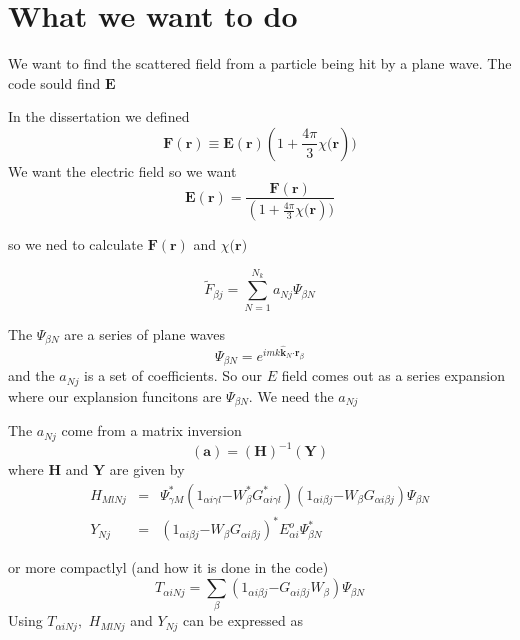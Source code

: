 \documentclass{article}
\begin{document}
\bigskip

\section{What we want to do}

We want to find the scattered field from a particle being hit by a plane
wave. The code sould find $\mathbf{E}$

In the dissertation we defined 
\begin{equation}
\mathbf{F}(\mathbf{r})\equiv \mathbf{E}(\mathbf{r})(1+\frac{4\pi }{3}\chi 
\mathbf{(r}))  \tag{38}  \label{EtoF}
\end{equation}%
We want the electric field so we want%
\[
\mathbf{E}(\mathbf{r})=\frac{\mathbf{F}(\mathbf{r})}{(1+\frac{4\pi }{3}\chi 
\mathbf{(r}))} 
\]

so we ned to calculate $\mathbf{F}(\mathbf{r})$ and $\chi \mathbf{(r})$

\begin{equation}
\tilde{F}_{\beta j}\mathbf{=}\sum_{N=1}^{N_{k}}a_{Nj}\Psi _{\beta N}
\label{CPSI}
\end{equation}

The $\Psi _{\beta N}$ are a series of plane waves%
\begin{equation}
\Psi _{\beta N}=e^{imk\mathbf{\hat{k}}_{N}\mathbf{\cdot r}_{\beta }}
\end{equation}%
and the $a_{Nj}$ is a set of coefficients. So our $E$ field comes out as a
series expansion where our explansion funcitons are $\Psi _{\beta N}$. We
need the $a_{Nj}$

The $a_{Nj}$ come from a matrix inversion 
\begin{equation}
\left( \mathbf{a}\right) =\left( \mathbf{H}\right) ^{-1}\left( \mathbf{Y}%
\right)  \label{aHY}
\end{equation}%
where $\mathbf{H}$ and $\mathbf{Y}$ are given by 
\begin{eqnarray}
H_{MlNj} &=&\Psi _{\gamma M}^{\ast }\left( 1_{\alpha i\gamma l}\mathbf{-}%
W_{\beta }^{\ast }G_{\alpha i\gamma l}^{\ast }\right) \left( 1_{\alpha
i\beta j}\mathbf{-}W_{\beta }G_{\alpha i\beta j}\right) \Psi _{\beta N} 
\nonumber \\
Y_{Nj} &=&\left( 1_{\alpha i\beta j}\mathbf{-}W_{\beta }G_{\alpha i\beta
j}\right) ^{\ast }E_{\alpha i}^{o}\Psi _{\beta N}^{\ast }
\end{eqnarray}

or more compactlyl (and how it is done in the code) 
\begin{equation}
T_{\alpha iNj}=\sum_{\beta }\left( 1_{\alpha i\beta j}\mathbf{-}G_{\alpha
i\beta j}W_{\beta }\right) \Psi _{\beta N}
\end{equation}%
Using $T_{\alpha iNj},$ $H_{MlNj}$ and $Y_{Nj}$ can be expressed as
\end{document}
